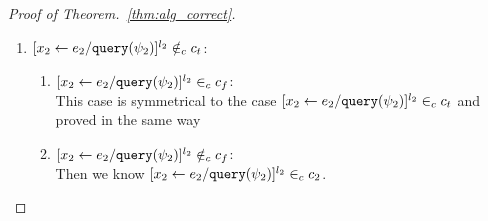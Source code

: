 \begin{proof}[Proof of Theorem.~\ref{thm:alg_correct}]
\begin{case}
\begin{subcase}
\begin{subsubcase}
\begin{subsubsubcase}
\begin{subproof}
\begin{enumerate}
\[
  x_2^{l_2} \in \lvar_{c_t}
\]
%
 By uniqueness of program label, we have:
 \[
 [\assign{{x}_2}{\expr_2 / \query(\qexpr_2)}]^{l_2} \notin_c c_f
 \]
 If $[\assign{{x}_2}{\expr_2 / \query(\qexpr_2)}]^{l_2} \notin_c c_2$,
we know $\forall \trace, \trace' \in \mathcal{T}$, there doesn't exist execution
 \[
  \config{c_f;c_2, \vtrace} \rightarrow^{*} 
  \config{[\assign{{x}_2}{\expr_2 / \query(\qexpr_2)}]^{l_2};{c}_4', \trace'}
 \]
 This is contradict to the existence of execution in Eq.\ref{eq:m1testif_inv2}.
 \\
 If $[\assign{{x}_2}{\expr_2 / \query(\qexpr_2)}]^{l_2} \in_c c_2$, 
 by uniqueness of label , 
 it must exist in the body of a while command in $c_2$,
 and $\eif ([b]^{l_b}, c_t, c_f) \in_c c_2$ and $[\assign{{x}_2}{\expr_2 / \query(\qexpr_2)}]^{l_2} \in_c c_t$. 
\\
%
i.e., $[\assign{{x}_2}{\expr_2 / \query(\qexpr_2)}]^{l_2}$ will only show up in $c_t$.
\\
%
By $\flowsto$ definition, we have:
\[
  \forall z_i^{r_i} \in \lvar_{c_t},  x_j^{l_j} \in \lvar_c \st x_j \in VAR(b) \land l_j = \llabel(\trace_{ih}) x_j \implies
  \flowsto(x_j^{l_j}, z_i^{r_i}, c)
\]
i.e.,
\[
  \bigwedge_{\{ x_j^{l_j} \in \lvar_c \vert x_j \in VAR(b) \land x_j^{l_j} \in \live^{l_b}(c)\}}
  \flowsto(x_j^{l_j}, x_2^{l_2}, c)
\]
%
Based on Eq.~\ref{eq:valdep_ihtestb}, we know:
%
\[
  \bigvee_{\{y_i^{r_i} \vert y_i \in VAR(b) \land r_i = \llabel(\trace_{ih}) y_i\}}
  \exists z_1^{j_1} \cdots z_m^{j_m}, m \in \mathbb{N} \st 
  \flowsto(x_1^{l_1}, z_1^{j_1}) \land \cdots \land  \flowsto(z_m^{j_m}, y_i^{r_i})
  \land \flowsto(y_i^{r_i}, x_2^{l_2}, c) 
\]
%
i.e.,
\[
\Big(\exists z_1^{r_1}, \cdots, z_n^{r_n} \in \lvar_{{c}} \st 0 \leq n 
 \land \flowsto(x_1^{l_1}, z_1^{r_1}, c) \land \cdots \land \flowsto(z_n^{r_n}, {x}_2^{l_2}, c) \Big)
\]
%
This case is proved.
\item $[\mathrel{ {x}_2 \leftarrow e_2 / {\tt query}(\psi_2) }]^{l_2} \notin_c c_t$:
\begin{enumerate}
 \item $[\mathrel{ {x}_2 \leftarrow e_2 / {\tt query}(\psi_2) }]^{l_2} \in_c c_f$:
 \\
 This case is symmetrical to the case $[\assign{{x}_2}{\expr_2 / \query(\qexpr_2)}]^{l_2} \in_c c_t$ and proved in the same way
 \item $[\mathrel{ {x}_2 \leftarrow e_2 / {\tt query}(\psi_2) }]^{l_2} \notin_c c_f$:
 \\
 Then we know $[\assign{{x}_2}{\expr_2 / \query(\qexpr_2)}]^{l_2} \in_c c_2$.

\end{enumerate}
\end{enumerate}
\end{subproof}
\end{subsubsubcase}
\end{subsubcase}
\end{subcase}
\end{case}
\end{proof}
